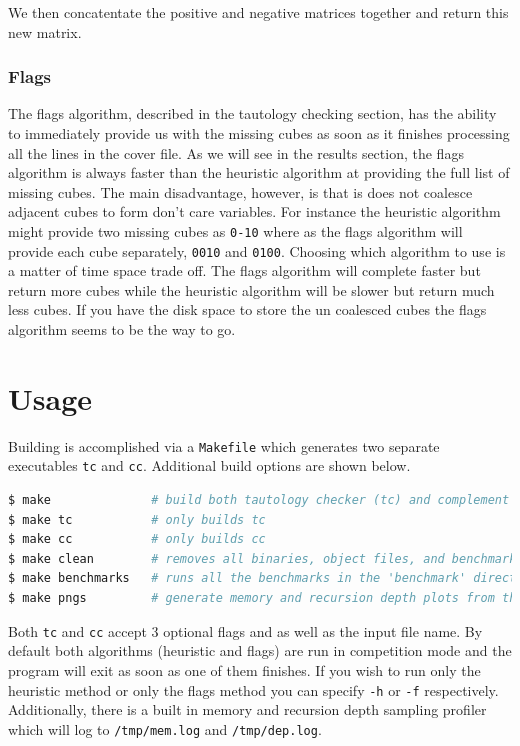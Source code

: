 \documentclass[10pt]{article}
\begin{document}
            We then concatentate the positive and negative matrices together and
            return this new matrix.

            \newpage
        \subsubsection{Flags}

            The flags algorithm, described in the tautology checking section,
            has the ability to immediately provide us with the missing cubes as
            soon as it finishes processing all the lines in the cover file. As we
            will see in the results section, the flags algorithm is always
            faster than the heuristic algorithm at providing the full list of
            missing cubes. The main disadvantage, however, is that is does not
            coalesce adjacent cubes to form don't care variables. For instance
            the heuristic algorithm might provide two missing cubes as
            \texttt{0-10} where as the flags algorithm will provide each cube
            separately, \texttt{0010} and \texttt{0100}. Choosing which
            algorithm to use is a matter of time space trade off. The flags
            algorithm will complete faster but return more cubes while the
            heuristic algorithm will be slower but return much less cubes. If
            you have the disk space to store the un coalesced cubes the flags
            algorithm seems to be the way to go.

\newpage
\section{Usage}

Building is accomplished via a \texttt{Makefile} which generates two separate
executables \texttt{tc} and \texttt{cc}. Additional build options are shown
below.

\begin{lstlisting}[language=bash]
$ make              # build both tautology checker (tc) and complement checker (cc)
$ make tc           # only builds tc
$ make cc           # only builds cc
$ make clean        # removes all binaries, object files, and benchmark results
$ make benchmarks   # runs all the benchmarks in the 'benchmark' directory
$ make pngs         # generate memory and recursion depth plots from the benchmark results
\end{lstlisting}

Both \texttt{tc} and \texttt{cc} accept 3 optional flags and as well as the
input file name.  By default both algorithms (heuristic and flags) are run in
competition mode and the program will exit as soon as one of them finishes. If
you wish to run only the heuristic method or only the flags method you can
specify \texttt{-h} or \texttt{-f} respectively. Additionally, there is a built
in memory and recursion depth sampling profiler which will log to
\texttt{/tmp/mem.log} and \texttt{/tmp/dep.log}.
\end{document}
